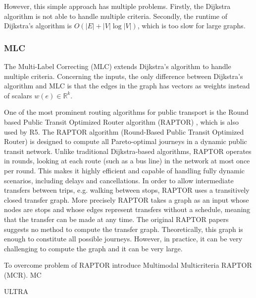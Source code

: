However, this simple approach has multiple problems.
Firstly, the Dijkstra algorithm is not able to handle multiple criteria.
Secondly, the runtime of Dijkstra's algorithm is \( O(|E| + |V| \log |V|) \), which is too slow for large graphs.


\subsubsection{MLC}
\label{subsubsec:mlc}

The Multi-Label Correcting (MLC)  extends Dijkstra's algorithm to handle multiple criteria.
Concerning the inputs, the only difference between Dijkstra's algorithm and MLC is that the edges in the graph has vectors as weights instead of scalars \( w(e) \in \mathbb{R}^k \).





One of the most prominent routing algorithms for public transport is the Round based Public Transit Optimized Router algorithm (RAPTOR) \cite{dellingRoundBasedPublicTransit2015}, which is also used by R5.
The RAPTOR algorithm (Round-Based Public Transit Optimized Router) is designed to compute all Pareto-optimal journeys in a dynamic public transit network.
Unlike traditional Dijkstra-based algorithms, RAPTOR operates in rounds, looking at each route (such as a bus line) in the network at most once per round.
This makes it highly efficient and capable of handling fully dynamic scenarios, including delays and cancellations.
In order to allow intermediate transfers between trips, e.g.
walking between stops, RAPTOR uses a transitively closed transfer graph.
More precisely RAPTOR takes a graph as an input whose nodes are stops and whose edges represent transfers without a schedule, meaning that the transfer can be made at any time.
The original RAPTOR papers suggests no method to compute the transfer graph.
Theoretically, this graph is enough to constitute all possible journeys.
However, in practice, it can be very challenging to compute the graph and it can be very large.


To overcome problem of RAPTOR \cite{dellingComputingMultimodalJourneys2013}
introduce Multimodal Multicriteria RAPTOR (MCR). MC

ULTRA
